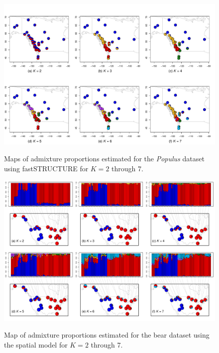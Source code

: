 \documentclass[10pt,letterpaper]{article}
\begin{document}
\begin{figure}
	\centering
		{\includegraphics[width=\textwidth]{figs/populus/poplar_fastStr_results.pdf}}
	\caption{
	Maps of admixture proportions estimated for the \textit{Populus} dataset 
	using fastSTRUCTURE \cite{fastStructure} for $K=2$ through 7.
    }\label{populus_fastStr}
\end{figure}

\begin{figure}
	\centering
		{\includegraphics[width=\textwidth]{figs/bears/bear_sp_results.pdf}}
	\caption{
	Map of admixture proportions estimated for the bear dataset 
	using the spatial model for $K=2$ through 7.
    }\label{bear_sp_pies}
\end{figure}
\end{document}
